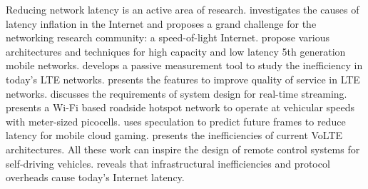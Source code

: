 Reducing network latency is an active area of research. 
\cite{singla2014internet} investigates the causes of latency inflation in the
Internet and proposes a grand challenge for the networking research 
community: a speed-of-light Internet. 
\cite{zhang20145g, agiwal2016next} propose various architectures and techniques
for high capacity and low latency 5th generation mobile networks. 
\cite{huang2013depth} develops a passive measurement tool to 
study the inefficiency in today's LTE networks. 
\cite{ali2013quality} presents the features to improve
quality of service in LTE networks. 
\cite{stonebraker20058} discusses the requirements of system
design for real-time streaming. 
\cite{song2017wifi} presents a Wi-Fi based roadside hotspot network to
operate at vehicular speeds with meter-sized picocells.
\cite{lee2015outatime} uses speculation to predict future frames to reduce 
latency for mobile cloud gaming.
\cite{tu2016volte} presents the inefficiencies of current VoLTE architectures. 
All these work can inspire the design of remote control systems for self-driving vehicles.
\cite{singla2014internet} reveals that
infrastructural inefficiencies and protocol
overheads cause today's Internet latency. 




